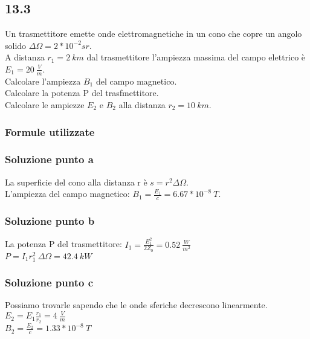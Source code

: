 \documentclass[../../main.tex]{subfiles}
\begin{document}
\subsection*{13.3}
Un trasmettitore emette onde elettromagnetiche in un cono che copre un angolo solido $\Delta \Omega = 2* 10^{-2} sr$.\\
A distanza $r_1 = 2\ km$ dal trasmettitore l'ampiezza massima del campo elettrico è $E_1 = 20\ \frac{V}{m}$.\\
Calcolare l'ampiezza $B_1$ del campo magnetico.\\
Calcolare la potenza P del trasfmettitore.\\
Calcolare le ampiezze $E_2$ e $B_2$ alla distanza $r_2 = 10\ km$.\\
\subsubsection*{Formule utilizzate}
\subsubsection*{Soluzione punto a}
La superficie del cono alla distanza r è $s = r^2 \Delta \Omega$.\\
L'ampiezza del campo magnetico: $B_1 = \frac{E_1}{c} = 6.67 * 10^{-8}\ T$.\\
\subsubsection*{Soluzione punto b}
La potenza P del trasmettitore: $I_1 = \frac{E_1^2}{2Z_0} = 0.52\ \frac{W}{m^2}$\\
$P = I_1 r_1^2\ \Delta\Omega = 42.4\ kW$\\
\subsubsection*{Soluzione punto c}
Possiamo trovarle sapendo che le onde sferiche decrescono linearmente.\\
$E_2 = E_1\frac{r_1}{r_2} = 4\ \frac{V}{m}$\\
$B_2 = \frac{E_2}{c} = 1.33 * 10^{-8}\ T$\\
\newpage
\end{document}
